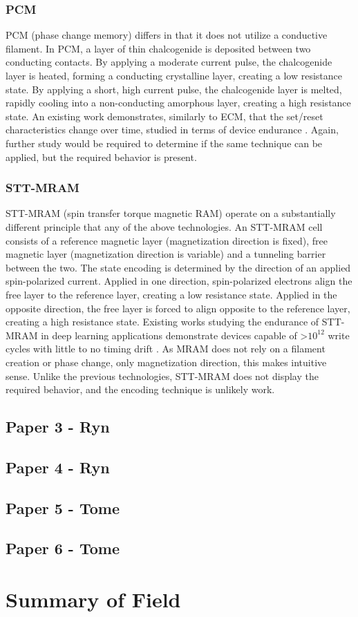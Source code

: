 \documentclass[sigconf,authoryear]{acmart}
\begin{document}
\subsubsection{PCM}
PCM (phase change memory) differs in that it does not utilize a conductive filament. In PCM, a layer of thin chalcogenide is deposited 
between two conducting contacts. By applying a moderate current pulse, the chalcogenide layer is heated, forming a conducting 
crystalline layer, creating a low resistance state. By applying a short, high current pulse, the chalcogenide layer is melted, 
rapidly cooling into a non-conducting amorphous layer, creating a high resistance state. An existing work demonstrates, similarly to ECM, 
that the set/reset characteristics change over time, studied in terms of device endurance \cite{PCM}. Again, further study would be 
required to determine if the same technique can be applied, but the required behavior is present.

\subsubsection{STT-MRAM}
STT-MRAM (spin transfer torque magnetic RAM) operate on a substantially different principle that any of the above technologies. 
An STT-MRAM cell consists of a reference magnetic layer (magnetization direction is fixed), free magnetic layer (magnetization direction 
is variable) and a tunneling barrier between the two. The state encoding is determined by the direction of an applied spin-polarized 
current. Applied in one direction, spin-polarized electrons align the free layer to the reference layer, creating a low resistance state. 
Applied in the opposite direction, the free layer is forced to align opposite to the reference layer, creating a high resistance state. 
Existing works studying the endurance of STT-MRAM in deep learning applications demonstrate devices capable of >$10^{12}$ write cycles 
with little to no timing drift \cite{MRAM}. As MRAM does not rely on a filament creation or phase change, only magnetization direction, 
this makes intuitive sense. Unlike the previous technologies, STT-MRAM does not display the required behavior, and the encoding technique 
is unlikely work.


\subsection{Paper 3 - Ryn}


\subsection{Paper 4 - Ryn } 

\subsection{Paper 5 - Tome}

\subsection{Paper 6 - Tome}

\section{Summary of Field}
\begin{comment}
    - field summary
    - paragraph
\end{comment}




\end{document}
